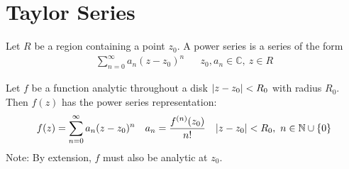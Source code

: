 \documentclass[12pt, english]{book}
\begin{document}
	\section{Taylor Series} \label{Taylor Series Section - Complex}
	
	\begin{definition}
		\label{Power Series Definition - Complex}
		Let \(R\) be a region containing a point \(z_0\). A power series is a series of the form
		\begin{align*}
			\sum_{n=0}^{\infty} a_n (z - z_0)^n && z_0, a_n \in \mathbb{C}, \ z \in R
		\end{align*}
	\end{definition}
	
	\begin{theorem}
		\label{Taylor's Theorem - Complex}
		Let \(f\) be a function analytic throughout a disk \(\abs{z-z_0} < R_0\) with radius \(R_0\). Then \(f(z)\) has the power series representation:
		\begin{align*}
			f(z) &= \sum_{n=0}^{\infty} a_n (z-z_0)^n 
				& a_n &= \frac{f^{(n)}(z_0)}{n!}
				& \abs{z-z_0} < R_0, \ n \in \mathbb{N}\cup\{0\}
		\end{align*}
		Note: By extension, \(f\) must also be analytic at \(z_0\).
	\end{theorem}
\end{document}
